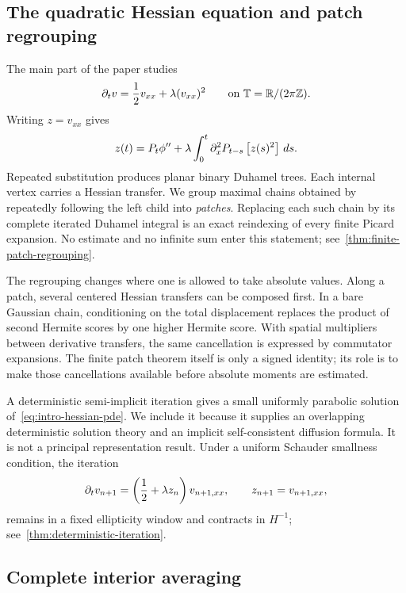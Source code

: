 \subsection{The quadratic Hessian equation and patch regrouping}

The main part of the paper studies
\begin{equation}
  \partial_tv
  =
  \frac12v_{xx}+\lambda(v_{xx})^2
  \qquad\text{on }\mathbb T=\mathbb R/(2\pi\mathbb Z).
  \label{eq:intro-hessian-pde}
\end{equation}
Writing $z=v_{xx}$ gives
\begin{equation}
  z(t)
  =
  P_t\phi''
  +\lambda\int_0^t
  \partial_x^2P_{t-s}\left[z(s)^2\right]\,ds.
  \label{eq:intro-hessian-mild}
\end{equation}
Repeated substitution produces planar binary Duhamel trees. Each internal vertex carries a Hessian transfer. We group maximal chains obtained by repeatedly following the left child into \emph{patches}. Replacing each such chain by its complete iterated Duhamel integral is an exact reindexing of every finite Picard expansion. No estimate and no infinite sum enter this statement; see~\cref{thm:finite-patch-regrouping}.

The regrouping changes where one is allowed to take absolute values. Along a patch, several centered Hessian transfers can be composed first. In a bare Gaussian chain, conditioning on the total displacement replaces the product of second Hermite scores by one higher Hermite score. With spatial multipliers between derivative transfers, the same cancellation is expressed by commutator expansions. The finite patch theorem itself is only a signed identity; its role is to make those cancellations available before absolute moments are estimated.

A deterministic semi-implicit iteration gives a small uniformly parabolic solution of~\eqref{eq:intro-hessian-pde}. We include it because it supplies an overlapping deterministic solution theory and an implicit self-consistent diffusion formula. It is not a principal representation result. Under a uniform Schauder smallness condition, the iteration
\begin{equation*}
  \partial_tv_{n+1}
  =
  \left(\frac12+\lambda z_n\right)v_{n+1,xx},
  \qquad
  z_{n+1}=v_{n+1,xx},
\end{equation*}
remains in a fixed ellipticity window and contracts in $H^{-1}$; see~\cref{thm:deterministic-iteration}.

\subsection{Complete interior averaging}

